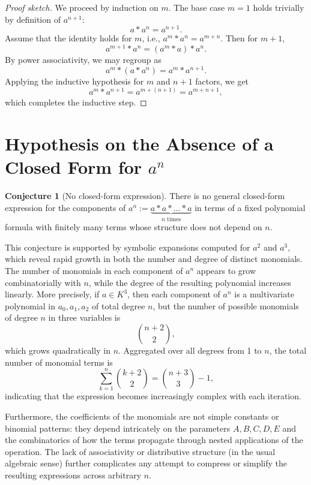 \documentclass[12pt]{article}
\theoremstyle{definition}
\newtheorem{conjecture}[definition]{Conjecture}
\theoremstyle{plain}
\theoremstyle{remark}
\begin{document}
\begin{proof}[Proof sketch]
We proceed by induction on \( m \). The base case \( m = 1 \) holds trivially by definition of \( a^{n+1} \):
\[
a * a^n = a^{n+1}.
\]
Assume that the identity holds for \( m \), i.e., \( a^m * a^n = a^{m+n} \). Then for \( m+1 \),
\[
a^{m+1} * a^n = (a^m * a) * a^n.
\]
By power associativity, we may regroup as
\[
a^m * (a * a^n) = a^m * a^{n+1}.
\]
Applying the inductive hypothesis for \( m \) and \( n+1 \) factors, we get
\[
a^m * a^{n+1} = a^{m+(n+1)} = a^{m+n+1},
\]
which completes the inductive step.
\end{proof}

\section{Hypothesis on the Absence of a Closed Form for \texorpdfstring{$a^n$}{aⁿ}}

\begin{conjecture}[No closed-form expression]
There is no general closed-form expression for the components of \( a^n := \underbrace{a * a * \dots * a}_{n \text{ times}} \) in terms of a fixed polynomial formula with finitely many terms whose structure does not depend on \( n \).
\end{conjecture}

This conjecture is supported by symbolic expansions computed for \( a^2 \) and \( a^3 \), which reveal rapid growth in both the number and degree of distinct monomials. The number of monomials in each component of \( a^n \) appears to grow combinatorially with \( n \), while the degree of the resulting polynomial increases linearly. More precisely, if \( a \in K^3 \), then each component of \( a^n \) is a multivariate polynomial in \( a_0, a_1, a_2 \) of total degree \( n \), but the number of possible monomials of degree \( n \) in three variables is
\[
\binom{n+2}{2},
\]
which grows quadratically in \( n \). Aggregated over all degrees from 1 to \( n \), the total number of monomial terms is
\[
\sum_{k=1}^n \binom{k+2}{2} = \binom{n+3}{3} - 1,
\]
indicating that the expression becomes increasingly complex with each iteration.

Furthermore, the coefficients of the monomials are not simple constants or binomial patterns: they depend intricately on the parameters \( A, B, C, D, E \) and the combinatorics of how the terms propagate through nested applications of the operation. The lack of associativity or distributive structure (in the usual algebraic sense) further complicates any attempt to compress or simplify the resulting expressions across arbitrary \( n \).
\end{document}

